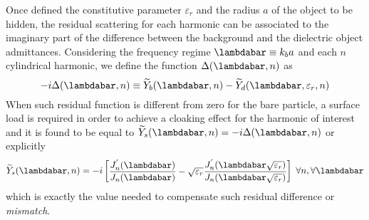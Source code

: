 \documentclass[reprint, showpacs, amsmath,amssymb, aps,
prb]{revtex4-1}
\begin{document}
Once defined the constitutive parameter $\varepsilon_r$ and the radius $a$ of the object to be hidden, the residual scattering for each harmonic can be associated to the imaginary part  of the difference between the background and the dielectric object admittances. Considering the frequency regime $\lambdabar\equiv k_b a$ and each $n$ cylindrical harmonic, 
%
%
we define the function $\Delta(\lambdabar,n)$ as 
%
\begin{equation}
-i\Delta(\lambdabar,n)\equiv\widetilde{Y}_b(\lambdabar, n)-\widetilde{Y}_d(\lambdabar,\varepsilon_r, n) 
\end{equation} 
%
When such residual function is different from zero for the bare particle, a surface load is required in order to achieve a cloaking effect for the harmonic of interest and it is found to be equal to $\widetilde{Y}_s(\lambdabar,n)=-i\Delta(\lambdabar,n)$ or explicitly 
%
\begin{equation}
\widetilde{Y}_s(\lambdabar,n)=-i\begin{bmatrix}
\dfrac{J^{'}_n(\lambdabar)}{J_n(\lambdabar)} -\sqrt{\varepsilon_r}\dfrac{J^{'}_n(\lambdabar\sqrt{\varepsilon_r})}{J_n(\lambdabar\sqrt{\varepsilon_r})} \end{bmatrix}\hspace{1mm} \forall n, \forall \lambdabar
\label{zero_contrast_Ys}
\end{equation} 
%
which is exactly the value needed to compensate such residual difference or \textit{mismatch}.
\end{document}
